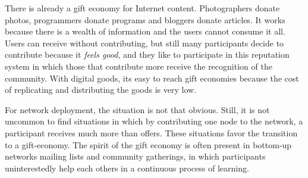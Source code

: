 \documentclass[journal]{IEEEtran}
\begin{document}
There is already a gift economy for Internet content.
Photographers donate photos, programmers donate programs and bloggers donate articles.
It works because there is a wealth of information and the users cannot consume it all.
Users can receive without contributing, but still many participants decide to contribute because it \emph{feels good}, and they like to participate in this reputation system in which those that contribute more receive the recognition of the community.
With digital goods, its easy to reach gift economies because the cost of replicating and distributing the goods is very low.

For network deployment, the situation is not that obvious.
Still, it is not uncommon to find situations in which by contributing one node to the network, a participant receives much more than offers.
These situations favor the transition to a gift-economy.
The spirit of the gift economy is often present in bottom-up networks mailing lists and community gatherings, in which participants uninterestedly help each others in a continuous process of learning.




\end{document}
